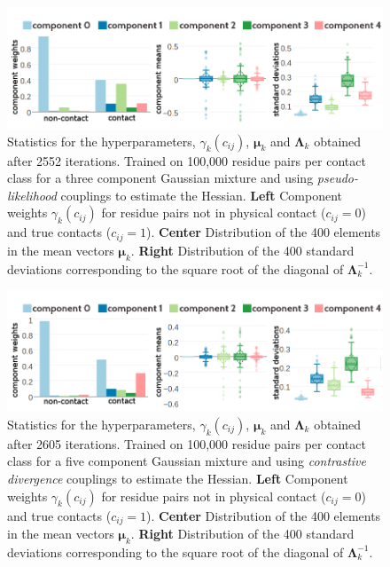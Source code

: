 \documentclass[11pt,a4paper,twoside]{book}
\newcommand{\eq}{\!=\!}
\newcommand{\Lk}{\mathbf{\Lambda}_k}
\newcommand{\muk}{\mathbf{\mu}_k}
\newcommand{\cij}{c_{ij}}
\theoremstyle{definition}
\theoremstyle{definition}
\theoremstyle{remark}
\begin{document}
\begin{figure}
\includegraphics[width=1\linewidth]{img/bayesian_model/pll/5/stats-pll-5comp-100k_contactthr25} \caption{Statistics for the hyperparameters,
\(\gamma_k(\cij)\), \(\muk\) and \(\Lk\) obtained after 2552 iterations.
Trained on 100,000 residue pairs per contact class for a three component
Gaussian mixture and using \emph{pseudo-likelihood} couplings to
estimate the Hessian. \textbf{Left} Component weights \(\gamma_k(\cij)\)
for residue pairs not in physical contact (\(\cij \eq 0\)) and true
contacts (\(\cij \eq 1\)). \textbf{Center} Distribution of the 400
elements in the mean vectors \(\muk\). \textbf{Right} Distribution of
the 400 standard deviations corresponding to the square root of the
diagonal of \(\Lk^{-1}\).}\label{fig:stats-pll-5comp-100k}
\end{figure}












\begin{figure}
\includegraphics[width=1\linewidth]{img/bayesian_model/cd/5/stats-cd-5comp-100k_contactthr25} \caption{Statistics for the hyperparameters,
\(\gamma_k(\cij)\), \(\muk\) and \(\Lk\) obtained after 2605 iterations.
Trained on 100,000 residue pairs per contact class for a five component
Gaussian mixture and using \emph{contrastive divergence} couplings to
estimate the Hessian. \textbf{Left} Component weights \(\gamma_k(\cij)\)
for residue pairs not in physical contact (\(\cij \eq 0\)) and true
contacts (\(\cij \eq 1\)). \textbf{Center} Distribution of the 400
elements in the mean vectors \(\muk\). \textbf{Right} Distribution of
the 400 standard deviations corresponding to the square root of the
diagonal of \(\Lk^{-1}\).}\label{fig:stats-cd-5comp-100k}
\end{figure}
\end{document}

